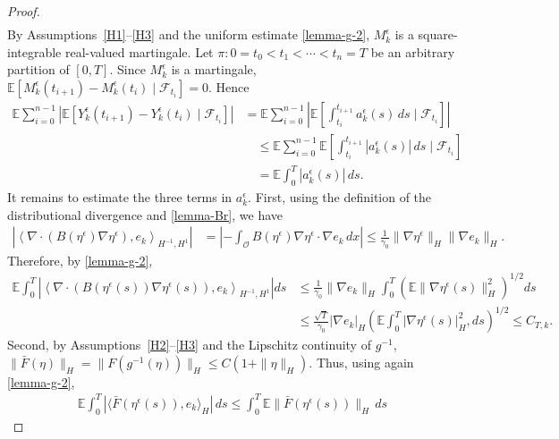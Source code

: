 \documentclass[10pt,a4paper]{amsart}
\theoremstyle{plain}
\numberwithin{equation}{section}
\begin{document}
\begin{proof}
\[\begin{aligned}
\end{aligned}
\]
By Assumptions~\ref{H1}--\ref{H3} and the uniform estimate \eqref{lemma-g-2}, \(M_k^\epsilon\) is a square-integrable real-valued
martingale.
Let \(\pi: 0=t_0<t_1<\cdots<t_n=T \) be an arbitrary partition of \([0,T]\). Since \(M_k^\epsilon\) is a martingale,
\(\mathbb E\left[ M_k^\epsilon(t_{i+1})-M_k^\epsilon(t_i)\mid \mathcal F_{t_i}\right]=0 .\)
Hence
\[
\begin{aligned}
\mathbb E\sum_{i=0}^{n-1}\left|\mathbb E\left[Y_k^\epsilon(t_{i+1})-Y_k^\epsilon(t_i)\mid \mathcal F_{t_i}\right]\right|  
 &= \mathbb E\sum_{i=0}^{n-1}\left|\mathbb E\left[\int_{t_i}^{t_{i+1}} a_k^\epsilon(s)\,ds\mid \mathcal F_{t_i}\right]\right|          \\
&\quad \le \mathbb E\sum_{i=0}^{n-1}\mathbb E\left[\int_{t_i}^{t_{i+1}} |a_k^\epsilon(s)|\,ds\mid \mathcal F_{t_i}\right]   \\
&\quad = \mathbb E\int_0^T |a_k^\epsilon(s)|\,ds .
\end{aligned}
\]
It remains to estimate the three terms in \(a_k^\epsilon\). First, using the definition of the distributional divergence and
\eqref{lemma-Br}, we have
\[
\begin{aligned}
\left|\left\langle\nabla\cdot\left(B(\eta^\epsilon)\nabla\eta^\epsilon\right),e_k\right\rangle_{H^{-1},H^1}\right|
&=\left|-\int_{\mathcal O}B(\eta^\epsilon)\nabla\eta^\epsilon\cdot\nabla e_k\,dx\right|                                                
\le\frac1{\gamma_0}\|\nabla\eta^\epsilon\|_H\|\nabla e_k\|_H .\end{aligned}
\]
Therefore, by \eqref{lemma-g-2},
\[
\begin{aligned}
 \mathbb E\int_0^T\left|\left\langle\nabla\cdot\left(B(\eta^\epsilon(s))\nabla\eta^\epsilon(s)\right),e_k\right\rangle_{H^{-1},H^1}\right|ds                                          
 &  \le\frac1{\gamma_0}\|\nabla e_k\|_H\int_0^T\left(\mathbb E\|\nabla\eta^\epsilon(s)\|_H^2\right)^{1/2}ds\\
&\leq\frac{\sqrt{T}}{\gamma_0}|\nabla e_k|_H\left(\mathbb E\int_0^T|\nabla\eta^\epsilon(s)|_H^2,ds\right)^{1/2} \le C_{T,k}.
\end{aligned}
\]
Second, by Assumptions~\ref{H2}--\ref{H3} and the Lipschitz continuity of \(g^{-1}\), \(\|\bar F(\eta)\|_H=\|F(g^{-1}(\eta))\|_H\le C(1+\|\eta\|_H).\)
Thus, using again \eqref{lemma-g-2},
\[
\begin{aligned}
\mathbb E\int_0^T |\langle \bar F(\eta^\epsilon(s)),e_k\rangle_H|\,ds\le\int_0^T\mathbb E\|\bar F(\eta^\epsilon(s))\|_H\,ds        

\end{aligned}\]
\end{proof}
\end{document}
